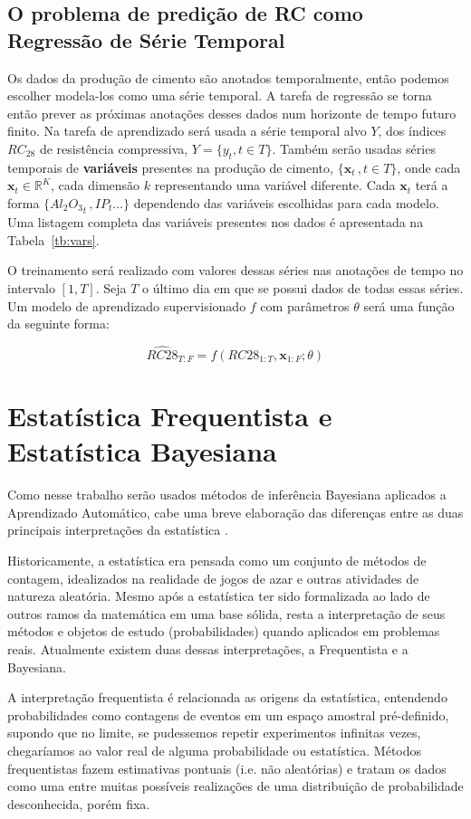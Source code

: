 \subsection{O problema de predição de RC como Regressão de Série Temporal}


Os dados da produção de cimento são anotados temporalmente, então podemos escolher
modela-los como uma série temporal. A tarefa de regressão se torna então prever as próximas anotações desses
dados num horizonte de tempo futuro finito.
Na tarefa de aprendizado será usada a série temporal alvo $Y$, dos índices
$RC_{28}$ de resistência compressiva, $Y = \{y_t , t \in T \}$.
Também serão usadas séries temporais de
\textbf{variáveis} presentes na produção de cimento, $\{ \textbf{x}_t  \, , t
\in T  \}$, onde cada $\textbf{x}_t \in \mathbb{R}^K$, cada dimensão $k$
representando uma variável diferente. Cada $\textbf{x}_t$ terá a forma
$\{{Al_2O_3}_t\, , IP_t \dots \}$ dependendo das variáveis escolhidas para cada
modelo. Uma listagem completa das variáveis presentes nos dados é apresentada na
Tabela~\ref{tb:vars}.

O treinamento será realizado com valores dessas séries nas anotações de tempo no intervalo $[1,T]$. Seja $T$ o último dia em que se possui dados de todas essas
séries. Um modelo de aprendizado supervisionado $f$ com parâmetros $\theta$ será
uma função da seguinte forma:


\[
  \hat{RC28}_{T:F}  = f ( RC28_{1:T},\textbf{x}_{{1}:F} ; \theta)
\]


\section{Estatística Frequentista e Estatística Bayesiana}
 
Como nesse trabalho serão usados métodos de inferência Bayesiana aplicados a Aprendizado Automático,
cabe uma breve elaboração das diferenças entre as duas principais
interpretações da estatística \citep{dlbook}. 

Historicamente, a estatística era pensada como um conjunto de métodos de
contagem, idealizados na realidade de jogos de azar e outras atividades de
natureza aleatória. Mesmo após a estatística ter sido formalizada ao lado de
outros ramos da matemática em uma base sólida, resta a interpretação de seus
métodos e objetos de estudo (probabilidades) quando aplicados em problemas
reais. Atualmente existem duas dessas interpretações, a Frequentista e a
Bayesiana.

A interpretação frequentista é relacionada as origens da estatística, entendendo
probabilidades como contagens de eventos em um espaço amostral pré-definido,
supondo que no limite, se pudessemos repetir experimentos infinitas vezes,
chegaríamos ao valor real de alguma probabilidade ou estatística. Métodos
frequentistas fazem estimativas pontuais (i.e. não aleatórias) e tratam os dados como uma entre muitas
possíveis realizações de uma distribuição de probabilidade desconhecida, porém fixa. 

